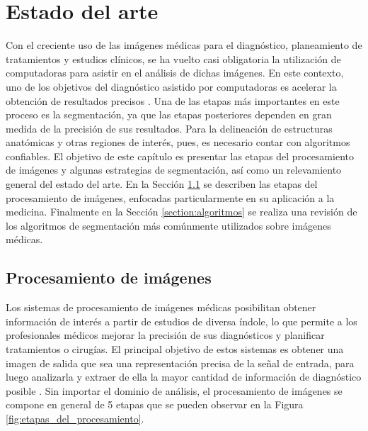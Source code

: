 \chapter{Estado del arte}\label{chapter:segmencation}
Con el creciente uso de las imágenes médicas para el diagnóstico, planeamiento de tratamientos y estudios clínicos, se ha vuelto casi obligatoria la utilización de computadoras para asistir en el análisis de dichas imágenes. En este contexto, uno de los objetivos del diagnóstico asistido por computadoras es acelerar la obtención de resultados precisos \citep{Sharma2010}. Una de las etapas más importantes en este proceso es la segmentación, ya que las etapas posteriores dependen en gran medida de la precisión de sus resultados. Para la delineación de estructuras anatómicas y otras regiones de interés, pues, es necesario contar con algoritmos confiables.
El objetivo de este capítulo es presentar las etapas del procesamiento de imágenes y algunas estrategias de segmentación, así como un relevamiento general del estado del arte. En la Sección \ref{section:procesamiento} se describen las etapas del procesamiento de imágenes, enfocadas particularmente en su aplicación a la medicina. Finalmente en la Sección \ref{section:algoritmos} se realiza una revisión de los algoritmos de segmentación más comúnmente utilizados sobre imágenes médicas.

\section{Procesamiento de imágenes}\label{section:procesamiento}
Los sistemas de procesamiento de imágenes médicas posibilitan obtener información de interés a partir de estudios de diversa índole, lo que permite a los profesionales médicos mejorar la precisión de sus diagnósticos y planificar tratamientos o cirugías. El principal objetivo de estos sistemas es obtener una imagen de salida que sea una representación precisa de la señal de entrada, para luego analizarla y extraer de ella la mayor cantidad de información de diagnóstico posible \citep{dougherty2009digital}. Sin importar el dominio de análisis, el procesamiento de imágenes se compone en general de 5 etapas que se pueden observar en la Figura \ref{fig:etapas_del_procesamiento}.


